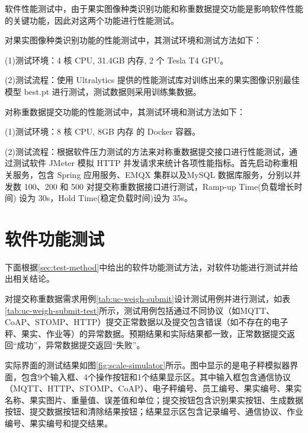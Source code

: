 软件性能测试中，由于果实图像种类识别功能和称重数据提交功能是影响软件性能的关键功能，因此对这两个功能进行性能测试。

对果实图像种类识别功能的性能测试中，其测试环境和测试方法如下：

(1)测试环境：4 核 CPU, 31.4GB 内存, 2 个 Tesla T4 GPU。

(2)测试流程：使用 Ultralytics 提供的性能测试库对训练出来的果实图像识别最佳模型 best.pt 进行测试，测试数据则采用训练集数据。

对称重数据提交功能的性能测试中，其测试环境和测试方法如下：

(1)测试环境：8 核 CPU, 8GB 内存 的 Docker 容器。

(2)测试流程：根据软件压力测试的方法\cite{Zhu2017}来对称重数据提交接口进行性能测试，通过测试软件 JMeter 模拟 HTTP 并发请求来统计各项性能指标。首先启动称重相关服务，包含 Spring 应用服务、EMQX 集群以及MySQL 数据库服务，分别以并发数 100、200 和 500 对提交称重数据接口进行测试，Ramp-up Time(负载增长时间) 设为 30s，Hold Time(稳定负载时间)设为 35s。

\section{软件功能测试}\label{sec:test-func}

下面根据\ref{sec:test-method}中给出的软件功能测试方法，对软件功能进行测试并给出相关结论。

对提交称重数据需求用例\ref{tab:uc-weigh-submit}设计测试用例并进行测试，如表\ref{tab:uc-weigh-submit-test}所示，测试用例包括通过不同协议（如MQTT、CoAP、STOMP、HTTP）提交正常数据以及提交包含错误（如不存在的电子秤、果实、作业等）的异常数据。预期结果和实际结果都一致，正常数据提交返回“成功”，异常数据提交返回“失败”。

实际界面的测试结果如图\ref{fig:scale-simulator}所示。图中显示的是电子秤模拟器界面，包含9个输入框、4个操作按钮和1个结果显示区。其中输入框包含通信协议（MQTT、HTTP、STOMP、CoAP）、电子秤编号、员工编号、果实编号、果实名称、果实图片、重量值、误差值和单位；提交按钮包含识别果实按钮、生成数据按钮、提交数据按钮和清除结果按钮；结果显示区包含记录编号、通信协议、作业编号、果实编号和提交结果。

